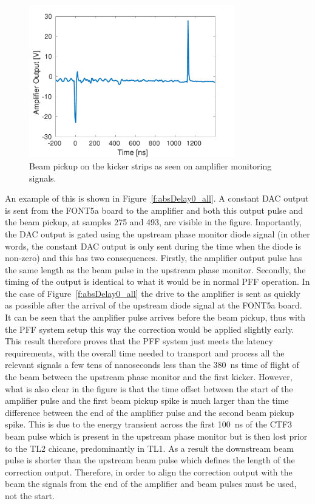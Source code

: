 \begin{figure}
  \centering
  \includegraphics[width=0.8\textwidth]{Figures/commissioning/beamPickup_noKick}
  \caption{Beam pickup on the kicker strips as seen on amplifier monitoring signals.}
  \label{f:beamPickup_noKick}
\end{figure}

An example of this is shown in Figure~\ref{f:absDelay0_all}. A constant DAC output is sent from the FONT5a board to the amplifier and both this output pulse and the beam pickup, at samples 275 and 493, are visible in the figure. Importantly, the DAC output is gated using the upstream phase monitor diode signal (in other words, the constant DAC output is only sent during the time when the diode is non-zero) and this has two consequences. Firstly, the amplifier output pulse has the same length as the beam pulse in the upstream phase monitor. Secondly, the timing of the output is identical to what it would be in normal PFF operation. In the case of Figure~\ref{f:absDelay0_all} the drive to the amplifier is sent as quickly as possible after the arrival of the upstream diode signal at the FONT5a board. It can be seen that the amplifier pulse arrives before the beam pickup, thus with the PFF system setup this way the correction would be applied slightly early. This result therefore proves that the PFF system just meets the latency requirements, with the overall time needed to transport and process all the relevant signals a few tens of nanoseconds less than the 380~ns time of flight of the beam between the upstream phase monitor and the first kicker. However, what is also clear in the figure is that the time offset between the start of the amplifier pulse and the first beam pickup spike is much larger than the time difference between the end of the amplifier pulse and the second beam pickup spike. This is due to the energy transient across the first 100~ns of the CTF3 beam pulse which is present in the upstream phase monitor but is then lost prior to the TL2 chicane, predominantly in TL1. As a result the downstream beam pulse is shorter than the upstream beam pulse which defines the length of the correction output. Therefore, in order to align the correction output with the beam the signals from the end of the amplifier and beam pulses must be used, not the start.

